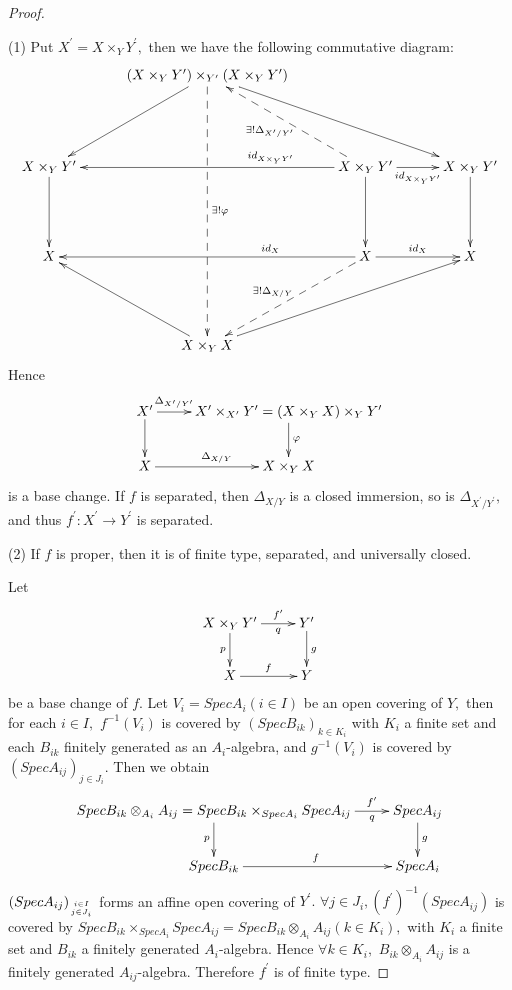 \begin{proof}\
\enum
\item[(1)]Put $X^{\prime}=X\times_Y Y^{\prime},$ then we have the
following commutative diagram:
\[ \xymatrix@R=5em@C=3em{
   & {(X\times_Y Y^{\prime})\times_{Y^{\prime}} (X\times_Y Y^{\prime})}
   \ar"2,1" \ar "2,4" \ar@{-->}"4,2"^{\exists ! \varphi}          \\
   {X\times_Y Y^{\prime}} \ar[d] & & {X\times_Y Y^{\prime}}
   \ar"2,1"_(.3){id_{X\times_Y Y^{\prime}}} \ar[r]_{id_{X\times_Y
   Y^{\prime}}} \ar@{-->}"1,2"^{\exists !
   \Delta_{X^{\prime}/Y^{\prime}}} \ar[d] & {X\times_Y Y^{\prime}} \ar[d] \\
   X & & X \ar"3,1"_(.3){id_X} \ar[r]^{id_X} \ar@{-->}"4,2"_{\exists !
   \Delta_{X/Y}} & X                                          \\
   & {X\times_Y X} \ar"3,1" \ar"3,4" }  \]
Hence
\[ \xymatrix{
   X^{\prime} \ar[d] \ar[r]^-{\Delta_{X^{\prime}/Y^{\prime}}} &
   {X^{\prime}\times_{X^{\prime}} Y^{\prime}=(X\times_Y X)\times_Y Y^{\prime}} \ar[d]^{\varphi}\\
   X \ar[r]^{\Delta_{X/Y}} & X\times_Y X } \]
is a base change. If $f$ is separated, then $\Delta_{X/Y}$ is a
closed immersion, so is $\Delta_{X^{\prime}/Y^{\prime}},$ and thus
$f^{\prime}: X^{\prime}\rightarrow Y^{\prime}$ is separated.
\item[(2)]If $f$ is proper, then it is of finite type, separated,
and universally closed.

Let
\[ \xymatrix{
   {X\times_Y Y^{\prime}} \ar[d]_p \ar[r]^-{f^{\prime}}_-{q} &
   Y^{\prime} \ar[d]^g                                     \\
   X \ar[r]^f & Y } \]
be a base change of $f.$ Let $V_i=SpecA_i(i\in I)$ be an open
covering of $Y,$ then for each $i\in I,$ $f^{-1}(V_i)$ is covered by
$(SpecB_{ik})_{k\in K_i}$ with $K_i$ a finite set and each $B_{ik}$
finitely generated as an $A_i$-algebra, and $g^{-1}(V_i)$ is covered
by $(SpecA_{ij})_{j\in J_i}.$ Then we obtain
\[ \xymatrix{
   {SpecB_{ik}\otimes_{A_i} A_{ij}=SpecB_{ik}\times_{SpecA_i} SpecA_{ij}}
   \ar[d]_p \ar[r]^-{f^{\prime}}_-{q} & SpecA_{ij} \ar[d]^g      \\
   SpecB_{ik} \ar[r]^f & SpecA_i } \]
$(SpecA_{ij})_{i\in I \atop j\in J_i}$ forms an affine open covering
of $Y^{\prime}.$ $\forall j\in J_i, (f^{\prime})^{-1}(SpecA_{ij})$
is covered by
$SpecB_{ik}\times_{SpecA_i}SpecA_{ij}=SpecB_{ik}\otimes_{A_i}A_{ij}(k\in
K_i),$ with $K_i$ a finite set and $B_{ik}$ a finitely generated
$A_i$-algebra. Hence $\forall k\in K_i,$ $B_{ik}\otimes_{A_i}
A_{ij}$ is a finitely generated $A_{ij}$-algebra. Therefore
$f^{\prime}$ is of finite type.


\end{proof}

